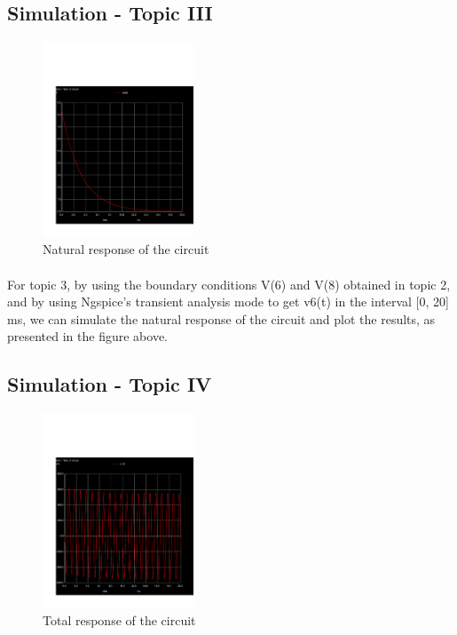 \subsection{Simulation - Topic III}
\label{subsec:sim_third}

\begin{figure}[H] \centering
\includegraphics[width=0.4\textwidth]{trans1.pdf}
\caption{Natural response of the circuit}
\label{fig:natural}
\end{figure}

\paragraph{}
For topic 3, by using the boundary conditions V(6) and V(8) obtained in topic 2, and by using Ngspice’s transient analysis mode to get v6(t) in the interval [0, 20] ms, we can simulate the natural response of the circuit and plot the results, as presented in the figure above.


\subsection{Simulation - Topic IV}
\label{subsec:sim_fourth}

\begin{figure}[H] \centering
\includegraphics[width=0.4\textwidth]{trans2.pdf}
\caption{Total response of the circuit}
\label{fig:total}
\end{figure}

